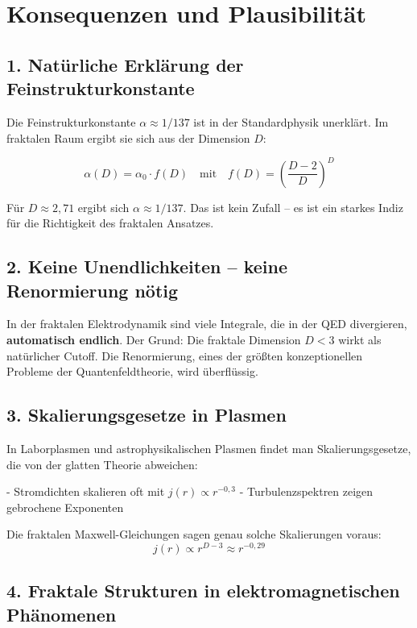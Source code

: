 \documentclass[12pt,a4paper]{article}
\begin{document}
\section{Konsequenzen und Plausibilität}

\subsection{1. Natürliche Erklärung der Feinstrukturkonstante}

Die Feinstrukturkonstante \(\alpha \approx 1/137\) ist in der Standardphysik unerklärt. Im fraktalen Raum ergibt sie sich aus der Dimension \(D\):

\[
\alpha(D) = \alpha_0 \cdot f(D) \quad \text{mit} \quad f(D) = \left( \frac{D-2}{D} \right)^{D} \tag{14}
\]

Für \(D \approx 2,71\) ergibt sich \(\alpha \approx 1/137\). Das ist kein Zufall – es ist ein starkes Indiz für die Richtigkeit des fraktalen Ansatzes.

\subsection{2. Keine Unendlichkeiten – keine Renormierung nötig}

In der fraktalen Elektrodynamik sind viele Integrale, die in der QED divergieren, \textbf{automatisch endlich}. Der Grund: Die fraktale Dimension \(D < 3\) wirkt als natürlicher Cutoff. Die Renormierung, eines der größten konzeptionellen Probleme der Quantenfeldtheorie, wird überflüssig.

\subsection{3. Skalierungsgesetze in Plasmen}

In Laborplasmen und astrophysikalischen Plasmen findet man Skalierungsgesetze, die von der glatten Theorie abweichen:

- Stromdichten skalieren oft mit \(j(r) \propto r^{-0,3}\)
- Turbulenzspektren zeigen gebrochene Exponenten

Die fraktalen Maxwell-Gleichungen sagen genau solche Skalierungen voraus:
\[
j(r) \propto r^{D-3} \approx r^{-0,29} \tag{15}
\]

\subsection{4. Fraktale Strukturen in elektromagnetischen Phänomenen}
\end{document}

